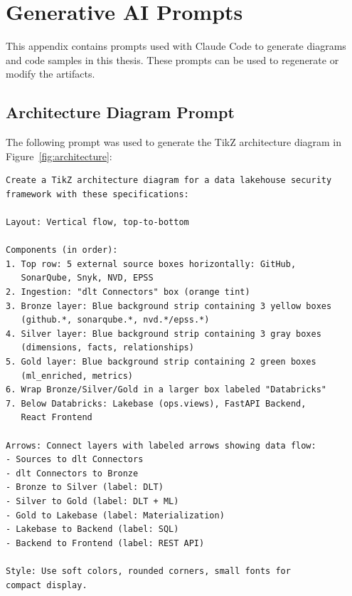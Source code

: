 \chapter{Generative AI Prompts}
\label{app:prompts}

This appendix contains prompts used with Claude Code to generate diagrams and code samples in this thesis. These prompts can be used to regenerate or modify the artifacts.

\section{Architecture Diagram Prompt}

The following prompt was used to generate the TikZ architecture diagram in Figure~\ref{fig:architecture}:

\begin{lstlisting}[frame=single, backgroundcolor=\color{backcolour}, rulecolor=\color{framecolour}, basicstyle=\small\ttfamily, breaklines=true]
Create a TikZ architecture diagram for a data lakehouse security
framework with these specifications:

Layout: Vertical flow, top-to-bottom

Components (in order):
1. Top row: 5 external source boxes horizontally: GitHub,
   SonarQube, Snyk, NVD, EPSS
2. Ingestion: "dlt Connectors" box (orange tint)
3. Bronze layer: Blue background strip containing 3 yellow boxes
   (github.*, sonarqube.*, nvd.*/epss.*)
4. Silver layer: Blue background strip containing 3 gray boxes
   (dimensions, facts, relationships)
5. Gold layer: Blue background strip containing 2 green boxes
   (ml_enriched, metrics)
6. Wrap Bronze/Silver/Gold in a larger box labeled "Databricks"
7. Below Databricks: Lakebase (ops.views), FastAPI Backend,
   React Frontend

Arrows: Connect layers with labeled arrows showing data flow:
- Sources to dlt Connectors
- dlt Connectors to Bronze
- Bronze to Silver (label: DLT)
- Silver to Gold (label: DLT + ML)
- Gold to Lakebase (label: Materialization)
- Lakebase to Backend (label: SQL)
- Backend to Frontend (label: REST API)

Style: Use soft colors, rounded corners, small fonts for
compact display.
\end{lstlisting}

